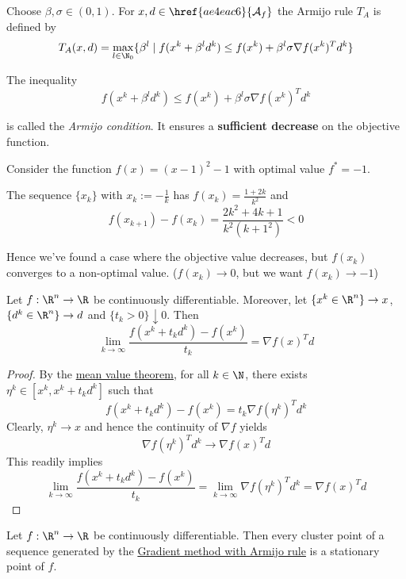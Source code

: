 \label{fefb024}

Choose $\beta,\sigma\in(0,1)$. For $x,d\in\href{ae4eac6}{\mathcal A_f}$ the
Armijo rule $T_A$ is defined by
$$
  T_A(x,d)=\max_{l\in\N_0}\{\beta^l\mid f(x^k+\beta^ld^k)\leq
  f(x^k)+\beta^l\sigma\nabla f(x^k)^Td^k\}
$$

The inequality
$$
  f(x^k+\beta^ld^k)\leq f(x^k)+\beta^l\sigma\nabla f(x^k)^Td^k
$$

is called the \textit{Armijo condition}. It ensures a \textbf{sufficient
  decrease} on the objective function.

\label{ae7f42d}

Consider the function $f(x)=(x-1)^2-1$ with optimal value $f^*=-1$.

The sequence $\{x_k\}$ with $x_k:=-\frac1k$ has $f(x_k)=\frac{1+2k}{k^2}$ and
$$
  f(x_{k+1})-f(x_k)=\frac{2k^2+4k+1}{k^2(k+1^2)}<0
$$

Hence we've found a case where the objective value decreases, but $f(x_k)$
converges to a non-optimal value. ($f(x_k)\to0$, but we want $f(x_k)\to-1$)

\label{f8e1f12}

Let $f:\R^n\to\R$ be continuously differentiable. Moreover, let
$\{x^k\in\R^n\}\to x$, $\{d^k\in\R^n\}\to d$ and $\{t_k>0\}\downarrow0$. Then
$$
  \lim_{k\to\infty}\frac{f(x^k+t_kd^k)-f(x^k)}{t_k}=\nabla f(x)^Td
$$

\begin{proof}
  By the \href{d37aa2b}{mean value theorem}, for all $k\in\N$, there
  exists $\eta^k\in[x^k,x^k+t_kd^k]$ such that
  $$
    f(x^k+t_kd^k)-f(x^k)=t_k\nabla f(\eta^k)^Td^k
  $$
  Clearly, $\eta^k\to x$ and hence the continuity of $\nabla f$ yields
  $$
    \nabla f(\eta^k)^Td^k\to\nabla f(x)^Td
  $$
  This readily implies
  $$
    \lim_{k\to\infty}\frac{f(x^k+t_kd^k)-f(x^k)}{t_k}=
    \lim_{k\to\infty}\nabla f(\eta^k)^Td^k=
    \nabla f(x)^Td
  $$
\end{proof}

\label{bbb25cd}

Let $f:\R^n\to\R$ be continuously differentiable. Then every cluster point of a
sequence generated by the \href{ae01f6d}{Gradient method with Armijo rule} is a
stationary point of $f$.

